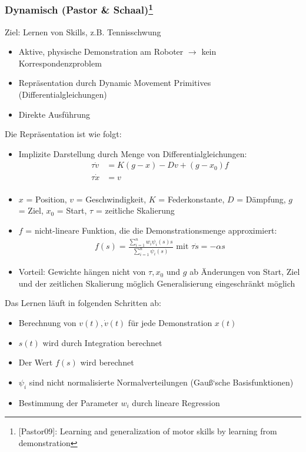 \subsubsection*{Dynamisch (Pastor \& Schaal)\footnote{[Pastor09]: Learning and generalization of motor skills by learning from demonstration}}
Ziel: Lernen von Skills, z.B. Tennisschwung
\begin{itemize}
\item Aktive, physische Demonstration am Roboter $\rightarrow$ kein Korrespondenzproblem
\item Repräsentation durch Dynamic Movement Primitives (Differentialgleichungen)
\item Direkte Ausführung
\end{itemize}
Die Repräsentation ist wie folgt:
\begin{itemize}
\item Implizite Darstellung durch Menge von Differentialgleichungen:
\begin{align*}
\tau \dot{v} &= K(g-x) -Dv + (g-x_0)f\\
\tau \dot{x} &= v\\
\end{align*}
\item $x$ = Position, $v$ = Geschwindigkeit, $K$ = Federkonstante,
$D$ = Dämpfung, $g$ = Ziel, $x_0$ = Start, $\tau$ = zeitliche Skalierung
\item $f$ = nicht-lineare Funktion, die die Demonstrationsmenge approximiert:
\begin{align*}
f(s) = \frac{\sum_{i=1}^n w_i\psi_i(s)s}{\sum_{i=1}^n \psi_i(s)} \text{ mit } \tau \dot{s} = -\alpha s
\end{align*}
\item Vorteil: Gewichte hängen nicht von $\tau, x_0 $ und $g$ ab
\ita Änderungen von Start, Ziel und der zeitlichen Skalierung möglich
\ita Generalisierung eingeschränkt möglich
\end{itemize}
Das Lernen läuft in folgenden Schritten ab:
\begin{itemize}
\item Berechnung von $v(t), \dot{v}(t)$ für jede Demonstration $x(t)$
\item $s(t)$ wird durch Integration berechnet
\item Der Wert $f(s)$ wird berechnet
\item $\psi_i$ sind nicht normalisierte Normalverteilungen (\Gu Gau{\ss}‘sche Basisfunktionen\Go)
\item Bestimmung der Parameter $w_i$ durch lineare Regression
\end{itemize}
